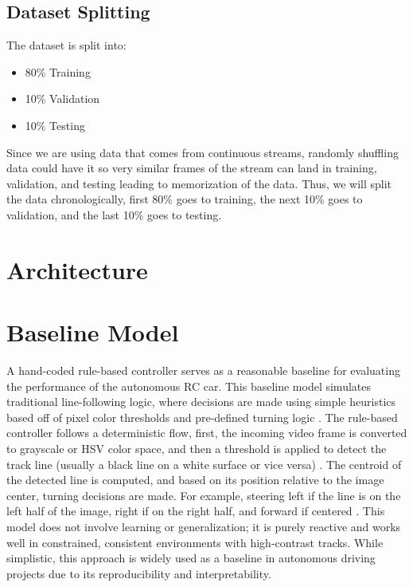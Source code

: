 \documentclass{article} %
\begin{document}
\subsection{Dataset Splitting}
The dataset is split into:
\begin{itemize}
  \item 80\% Training
  \item 10\% Validation 
  \item 10\% Testing 
\end{itemize}

Since we are using data that comes from continuous streams, randomly shuffling data could have
it so very similar frames of the stream can land in training, validation, and testing leading to 
memorization of the data. Thus, we will split the data chronologically, first 80\% goes to 
training, the next 10\% goes to validation, and the last 10\% goes to testing. 

\section{Architecture}

\section{Baseline Model}

A hand-coded rule-based controller serves as a reasonable baseline for evaluating the performance of the autonomous RC car. 
This baseline model simulates traditional line-following logic, where decisions are made using simple heuristics based off of 
pixel color thresholds and pre-defined turning logic \citep{LIKMETA2020103568}. The rule-based controller follows a deterministic flow, first, the incoming 
video frame is converted to grayscale or HSV color space, and then a threshold is applied to detect the track line (usually a black line 
on a white surface or vice versa) \citep{LIKMETA2020103568}. The centroid of the detected line is computed, and based on its position relative to the image center, 
turning decisions are made. For example, steering left if the line is on the left half of the image, right if on the right half, and forward if 
centered \citep{bojarski2016endendlearningselfdriving}. This model does not involve learning or generalization; it is purely reactive and works well in constrained, consistent environments 
with high-contrast tracks. While simplistic, this approach is widely used as a baseline in autonomous driving projects due to its reproducibility 
and interpretability.
\end{document}
